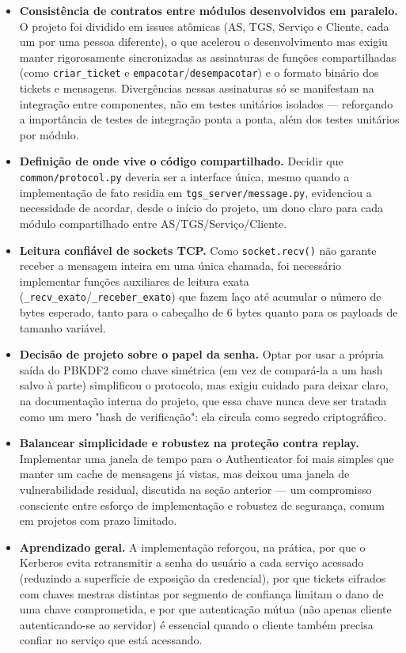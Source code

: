 \documentclass[11pt,a4paper]{article}
\begin{document}
\begin{itemize}
    \item \textbf{Consistência de contratos entre módulos desenvolvidos em paralelo.}
    O projeto foi dividido em issues atômicas (AS, TGS, Serviço e Cliente, cada um por uma
    pessoa diferente), o que acelerou o desenvolvimento mas exigiu manter rigorosamente
    sincronizadas as assinaturas de funções compartilhadas (como \texttt{criar\_ticket} e
    \texttt{empacotar}/\texttt{desempacotar}) e o formato binário dos tickets e mensagens.
    Divergências nessas assinaturas só se manifestam na integração entre componentes, não
    em testes unitários isolados --- reforçando a importância de testes de integração
    ponta a ponta, além dos testes unitários por módulo.
    \item \textbf{Definição de onde vive o código compartilhado.} Decidir que
    \texttt{common/protocol.py} deveria ser a interface única, mesmo quando a
    implementação de fato residia em \texttt{tgs\_server/message.py}, evidenciou a
    necessidade de acordar, desde o início do projeto, um dono claro para cada módulo
    compartilhado entre AS/TGS/Serviço/Cliente.
    \item \textbf{Leitura confiável de sockets TCP.} Como \texttt{socket.recv()} não
    garante receber a mensagem inteira em uma única chamada, foi necessário implementar
    funções auxiliares de leitura exata (\texttt{\_recv\_exato}/\texttt{\_receber\_exato})
    que fazem laço até acumular o número de bytes esperado, tanto para o cabeçalho de 6
    bytes quanto para os payloads de tamanho variável.
    \item \textbf{Decisão de projeto sobre o papel da senha.} Optar por usar a própria
    saída do PBKDF2 como chave simétrica (em vez de compará-la a um hash salvo à parte)
    simplificou o protocolo, mas exigiu cuidado para deixar claro, na documentação interna
    do projeto, que essa chave nunca deve ser tratada como um mero "hash de verificação":
    ela circula como segredo criptográfico.
    \item \textbf{Balancear simplicidade e robustez na proteção contra replay.} Implementar
    uma janela de tempo para o Authenticator foi mais simples que manter um cache de
    mensagens já vistas, mas deixou uma janela de vulnerabilidade residual, discutida na
    seção anterior --- um compromisso consciente entre esforço de implementação e robustez
    de segurança, comum em projetos com prazo limitado.
    \item \textbf{Aprendizado geral.} A implementação reforçou, na prática, por que o
    Kerberos evita retransmitir a senha do usuário a cada serviço acessado (reduzindo a
    superfície de exposição da credencial), por que tickets cifrados com chaves mestras
    distintas por segmento de confiança limitam o dano de uma chave comprometida, e por
    que autenticação mútua (não apenas cliente autenticando-se ao servidor) é essencial
    quando o cliente também precisa confiar no serviço que está acessando.
\end{itemize}
\end{document}

